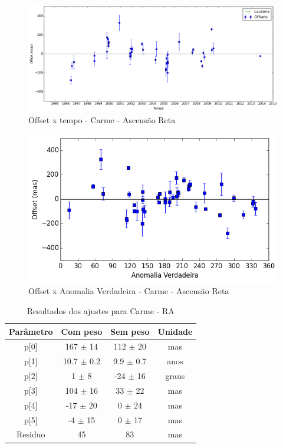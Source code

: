 \documentclass[11pt,a4paper]{report}
\begin{document}
\begin{figure}[h]
\caption{Offset x tempo - Carme - Ascensão Reta}
\includegraphics[scale=0.45]{Carme/RA.png} 
\end{figure}

\begin{figure}[h]
\caption{Offset x Anomalia Verdadeira - Carme - Ascensão Reta}
\includegraphics[scale=0.45]{Carme/RA_anom.png}  
\end{figure}

\begin{table}[h!]
\caption{\label{Tab: Carme-RA} Resultados dos ajustes para Carme - RA}
\begin{centering}
\begin{tabular}{cccc}
\hline
\hline
Parâmetro & Com peso & Sem peso & Unidade\tabularnewline
\hline
p[0] & 167 $\pm$ 14 & 112 $\pm$ 20 & mas\\
p[1] & 10.7 $\pm$ 0.2 & 9.9 $\pm$ 0.7 & anos\\
p[2] & 1 $\pm$ 8 & -24 $\pm$ 16 & graus\\
p[3] & 104 $\pm$ 16 & 33 $\pm$ 22 & mas\\
p[4] & -17 $\pm$ 20 & 0 $\pm$ 24 & mas\\
p[5] & -4 $\pm$ 15 & 0 $\pm$ 17 & mas\\
Residuo & 45 & 83 & mas\\
\hline 
\end{tabular} 
\par\end{centering}
\end{table}
\end{document}
